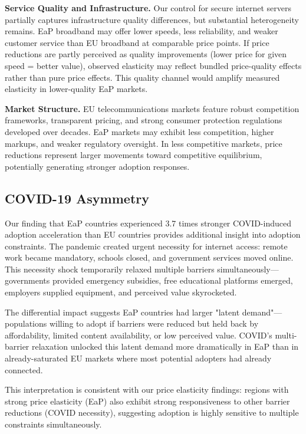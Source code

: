 \documentclass[12pt,review]{elsarticle}
\begin{document}
\textbf{Service Quality and Infrastructure.} Our control for secure internet servers partially captures infrastructure quality differences, but substantial heterogeneity remains. EaP broadband may offer lower speeds, less reliability, and weaker customer service than EU broadband at comparable price points. If price reductions are partly perceived as quality improvements (lower price for given speed = better value), observed elasticity may reflect bundled price-quality effects rather than pure price effects. This quality channel would amplify measured elasticity in lower-quality EaP markets.

\textbf{Market Structure.} EU telecommunications markets feature robust competition frameworks, transparent pricing, and strong consumer protection regulations developed over decades. EaP markets may exhibit less competition, higher markups, and weaker regulatory oversight. In less competitive markets, price reductions represent larger movements toward competitive equilibrium, potentially generating stronger adoption responses.

\subsection{COVID-19 Asymmetry}

Our finding that EaP countries experienced 3.7 times stronger COVID-induced adoption acceleration than EU countries provides additional insight into adoption constraints. The pandemic created urgent necessity for internet access: remote work became mandatory, schools closed, and government services moved online. This necessity shock temporarily relaxed multiple barriers simultaneously—governments provided emergency subsidies, free educational platforms emerged, employers supplied equipment, and perceived value skyrocketed.

The differential impact suggests EaP countries had larger "latent demand"—populations willing to adopt if barriers were reduced but held back by affordability, limited content availability, or low perceived value. COVID's multi-barrier relaxation unlocked this latent demand more dramatically in EaP than in already-saturated EU markets where most potential adopters had already connected.

This interpretation is consistent with our price elasticity findings: regions with strong price elasticity (EaP) also exhibit strong responsiveness to other barrier reductions (COVID necessity), suggesting adoption is highly sensitive to multiple constraints simultaneously.
\end{document}
